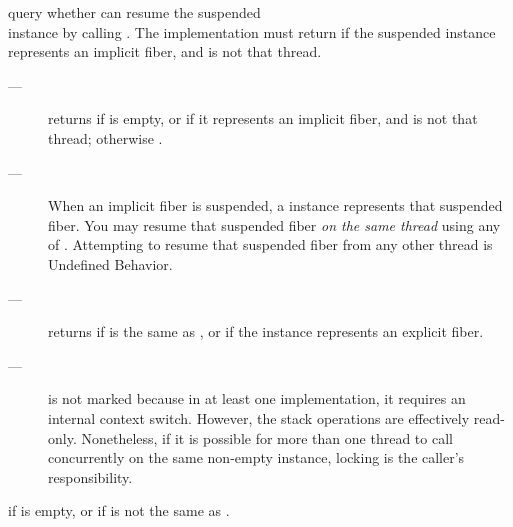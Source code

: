 

\effects
query whether \currthread can resume the suspended\\
\fiber instance by calling \xtresumesome. The implementation must
return  if the suspended \fiber instance represents an implicit
fiber, and \currthread is not that thread.\\

\returns
\begin{description}
    \item[---]  returns 
        if  is empty, or
        if it represents an implicit fiber,
        and \currthread is not that thread; otherwise .
\end{description}

\remarks
\begin{description}
    \item[---] When an implicit fiber is suspended, a \fiber instance represents that
        suspended fiber. You may resume that suspended fiber \emph{on the same thread}
        using any of \allresume. Attempting to
        resume that suspended fiber from any other thread is Undefined Behavior.
    \item[---] \canxtresume returns  if \currthread is the same as \lastthread,
        or if the \fiber instance represents an explicit fiber.
    \item[---] \canxtresume is not marked  because in at least one
        implementation, it requires an internal context switch. However, the
        stack operations are effectively read-only. Nonetheless, if it is
        possible for more than one thread to call \canxtresume concurrently on
        the same non-empty \fiber instance, locking is the caller's responsibility.
\end{description}


\returns
{} if  is empty, or if \currthread is not the same
as \lastthread. \\

